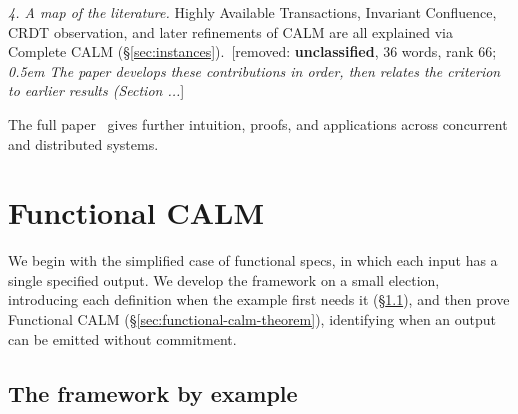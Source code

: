 \documentclass[sigconf]{cidr-2027}
\theoremstyle{remark}
\newcommand{\commitment}{commitment\xspace}
\newcommand{\removednote}[1]{{\color{cutred}\footnotesize\,[removed: #1]\,}}
\begin{document}
\textcolor{newblue}{\noindent
\emph{4. A map of the literature.} Highly Available Transactions, Invariant
        Confluence, CRDT observation, and later refinements of CALM are all explained via Complete CALM (\S\ref{sec:instances}).} \removednote{\textbf{unclassified}, 36 words, rank 66; \textit{0.5em The paper develops these contributions in order, then relates the criterion to earlier results (Section ...}}

\textcolor{newblue}{\vspace{0.5em}
\noindent
The full paper~\cite{hellerstein2026completecalmfull} gives further
intuition, proofs, and applications across concurrent and distributed systems.}


\section{Functional CALM}
\label{sec:functional-calm}

We begin with the simplified case of functional specs, in which each input has a
single specified output. \textcolor{newblue}{We develop the framework on a small election,
introducing each definition when the example first needs it
(\S\ref{sec:election-story}), and then prove Functional CALM
(\S\ref{sec:functional-calm-theorem}), identifying when an output can be
emitted without \commitment.}

\subsection{The framework by example}
\label{sec:election-story}
\label{sec:framework-brief}
\label{sec:functional-specifications}
\label{sec:functional-events}
\label{sec:executions}
\end{document}
